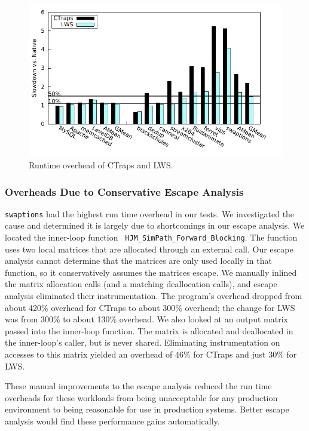 \documentclass[pageno,nohyperref]{jpaper}
\newcommand{\ctraps}{CTraps\xspace}
\newcommand{\lws}{LWS\xspace}
\newcommand{\Caption}[1]{\begin{minipage}{.95\columnwidth} \caption{#1} \end{minipage} \vspace{-1.2ex}}
\begin{document}
\begin{figure}
\centering
\includegraphics[width=.9\columnwidth]{plots/perf.pdf}
\Caption{\label{fig:perfall}Runtime overhead of \ctraps and \lws.}
\end{figure}

\subsubsection{Overheads Due to Conservative Escape Analysis}
\label{sec:eval:conservative}
{\tt swaptions} had the highest run time overhead in our tests.  We
investigated the cause and determined it is largely due to shortcomings in our
escape analysis.  We located the inner-loop function {\tt
HJM\_SimPath\_Forward\_Blocking}.  The function uses two local matrices that
are allocated through an external call.  Our escape analysis cannot determine
that the matrices are only used locally in that function, so it conservatively
assumes the matrices escape.  We manually inlined the matrix allocation calls
(and a matching deallocation calls), and escape analysis eliminated their
instrumentation.  The program's overhead dropped from about 420\% overhead for
\ctraps to about 300\% overhead; the change for \lws was from
300\% to about 130\% overhead.  We also looked at an output matrix passed into
the inner-loop function.  The matrix is allocated and deallocated in the
inner-loop's caller, but is never shared.  Eliminating instrumentation on
accesses to this matrix yielded an overhead of 46\% for \ctraps and 
just 30\% for \lws.  

These manual improvements to the escape analysis reduced the run time overheads
for these workloads from being unacceptable for any production environment to
being reasonable for use in production systems. Better escape analysis would
find these performance gains automatically.
\end{document}
